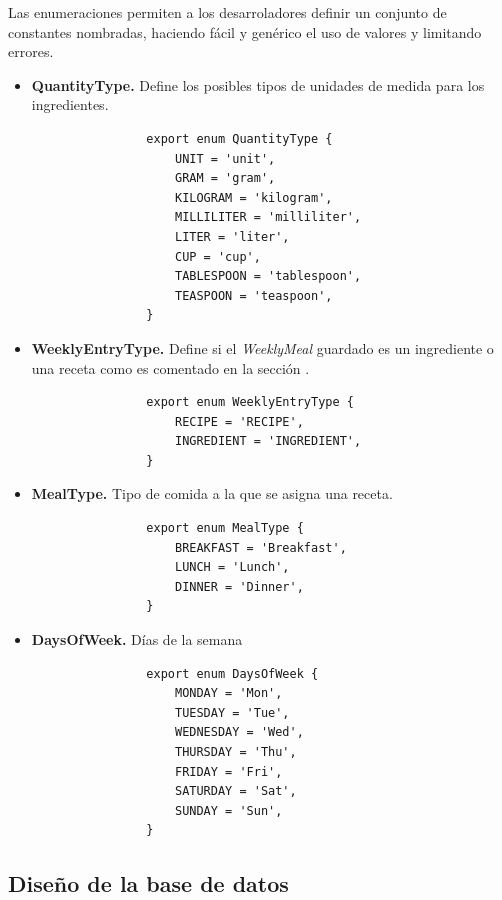 \documentclass[12pt,a4paper]{report} %
\begin{document}
	Las enumeraciones permiten a los desarroladores definir un conjunto de constantes nombradas, haciendo fácil y genérico el uso de valores y limitando errores.
	
	\begin{itemize}
		\item \textbf{QuantityType.} Define los posibles tipos de unidades de medida para los ingredientes.
			\begin{lstlisting}
				export enum QuantityType {
					UNIT = 'unit',
					GRAM = 'gram',
					KILOGRAM = 'kilogram',
					MILLILITER = 'milliliter',
					LITER = 'liter',
					CUP = 'cup',
					TABLESPOON = 'tablespoon',
					TEASPOON = 'teaspoon',
				}
			\end{lstlisting}
		\item \textbf{WeeklyEntryType.} Define si el \textit{WeeklyMeal} guardado es un ingrediente o una receta como es comentado en la sección . 
			\begin{lstlisting}
				export enum WeeklyEntryType {
					RECIPE = 'RECIPE',
					INGREDIENT = 'INGREDIENT',
				}
			\end{lstlisting}
		\item \textbf{MealType.} Tipo de comida a la que se asigna una receta.
			\begin{lstlisting}
				export enum MealType {
					BREAKFAST = 'Breakfast',
					LUNCH = 'Lunch',
					DINNER = 'Dinner',
				}
			\end{lstlisting}
		\item \textbf{DaysOfWeek.} Días de la semana
			\begin{lstlisting}
				export enum DaysOfWeek {
					MONDAY = 'Mon',
					TUESDAY = 'Tue',
					WEDNESDAY = 'Wed',
					THURSDAY = 'Thu',
					FRIDAY = 'Fri',
					SATURDAY = 'Sat',
					SUNDAY = 'Sun',
				}
			\end{lstlisting}
	\end{itemize}
	
	
	\subsection*{Diseño de la base de datos}
	\label{disenioDB}
	
\end{document}
